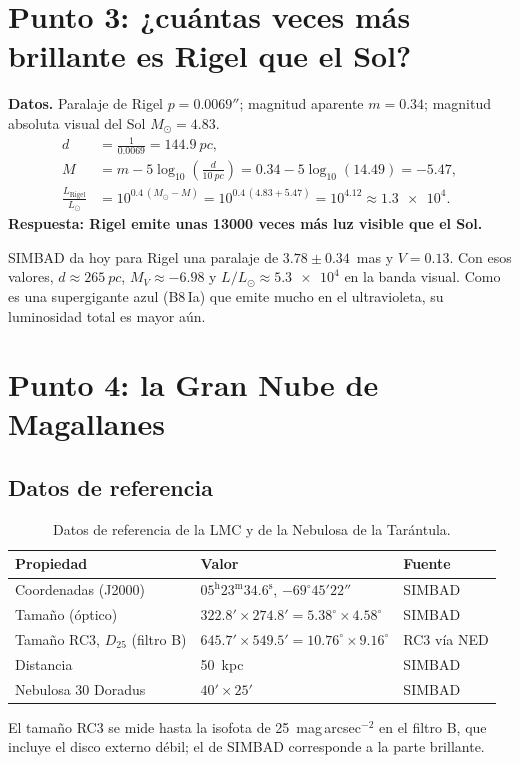\documentclass[11pt,a4paper]{article}
\begin{document}
\section{Punto 3: ¿cuántas veces más brillante es Rigel que el Sol?}

\textbf{Datos.} Paralaje de Rigel $p = 0.0069''$; magnitud aparente $m = 0.34$; magnitud absoluta
visual del Sol $M_\odot = 4.83$.
\begin{align}
d &= \frac{1}{0.0069} = \SI{144.9}{pc},\\
M &= m - 5\log_{10}\!\left(\frac{d}{\SI{10}{pc}}\right) = 0.34 - 5\log_{10}(14.49) = -5.47,\\
\frac{L_\text{Rigel}}{L_\odot} &= 10^{0.4\,(M_\odot - M)} = 10^{0.4\,(4.83 + 5.47)} = 10^{4.12}
\approx \num{1.3e4}.
\end{align}
\textbf{Respuesta: Rigel emite unas \num{13000} veces más luz visible que el Sol.}

SIMBAD da hoy para Rigel una paralaje de $3.78 \pm 0.34$~mas y $V = 0.13$. Con esos valores,
$d \approx \SI{265}{pc}$, $M_V \approx -6.98$ y $L/L_\odot \approx \num{5.3e4}$ en la banda visual. Como
es una supergigante azul (B8\,Ia) que emite mucho en el ultravioleta, su luminosidad total es mayor
aún.

\section{Punto 4: la Gran Nube de Magallanes}

\subsection{Datos de referencia}
\begin{table}[H]
\centering
\caption{Datos de referencia de la LMC y de la Nebulosa de la Tarántula.}
\begin{tabular}{lll}
\toprule
Propiedad & Valor & Fuente \\
\midrule
Coordenadas (J2000) & $05^\text{h}23^\text{m}34.6^\text{s}$, $-69^\circ45'22''$ & SIMBAD \\
Tamaño (óptico) & $322.8' \times 274.8' = 5.38^\circ \times 4.58^\circ$ & SIMBAD \cite{simbadlmc} \\
Tamaño RC3, $D_{25}$ (filtro B) & $645.7' \times 549.5' = 10.76^\circ \times 9.16^\circ$ & RC3 vía NED \cite{rc3} \\
Distancia & \SI{50}{kpc} & SIMBAD \\
Nebulosa 30 Doradus & $40' \times 25'$ & SIMBAD \\
\bottomrule
\end{tabular}
\end{table}
El tamaño RC3 se mide hasta la isofota de 25~mag\,arcsec$^{-2}$ en el filtro B, que incluye el disco
externo débil; el de SIMBAD corresponde a la parte brillante.
\end{document}
